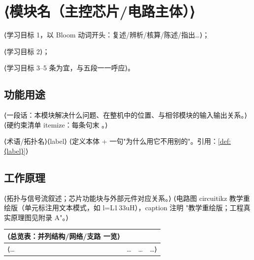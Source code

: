
\chapter{⟨模块名（主控芯片/电路主体）⟩}

\begin{introduction}
  \item ⟨学习目标 1，以 Bloom 动词开头：复述/辨析/核算/陈述/指出…⟩；
  \item ⟨学习目标 2⟩；
  \item ⟨学习目标 3--5 条为宜，与五段一一呼应⟩。
\end{introduction}

\section{功能用途}
⟨一段话：本模块解决什么问题、在整机中的位置、与相邻模块的输入输出关系。⟩
⟨硬约束清单 itemize：每条句末 。⟩

\begin{definition}{⟨术语/拓扑名⟩}{⟨label⟩}
⟨定义本体 + 一句"为什么用它不用别的"。引用：\ref{def:⟨label⟩}⟩
\end{definition}

\section{工作原理}
⟨拓扑与信号流叙述；芯片功能块与外部元件对应关系。⟩
⟨电路图 circuitikz 教学重绘版（单元标注用文本模式，如 l=L1\,33uH），caption 注明
  "教学重绘版；工程真实原理图见附录 A"。⟩

\begin{center}
\begin{tabular}{@{}llll@{}}
  \toprule
  ⟨总览表：并列结构/网络/支路 一览⟩ \\
  \midrule
  ⟨…&…&…&…⟩ \\
  \bottomrule
\end{tabular}
\end{center}

